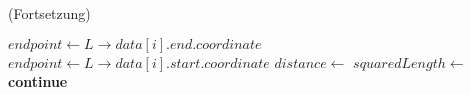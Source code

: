 \begin{algorithm}[ht]
\caption{ (Fortsetzung)}
\label{alg:findchainoflines2}
\begin{algorithmic}[1]
			\State $\mathit{endpoint} \gets L\mathit{\to data}[i]\mathit{.end.coordinate}$
		\Else
			\State $\mathit{endpoint} \gets L\mathit{\to data}[i]\mathit{.start.coordinate}$
		\EndIf
		\State $\mathit{distance} \gets$ 
		\State $\mathit{squaredLength} \gets$ 
			\State \textbf{continue}
		\EndIf
\end{algorithmic}
\end{algorithm}
